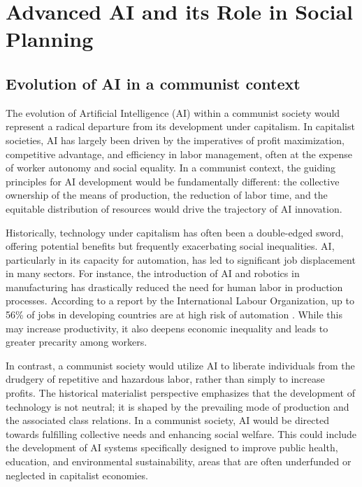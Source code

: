 \section{Advanced AI and its Role in Social Planning}

\subsection{Evolution of AI in a communist context}

The evolution of Artificial Intelligence (AI) within a communist society would represent a radical departure from its development under capitalism. In capitalist societies, AI has largely been driven by the imperatives of profit maximization, competitive advantage, and efficiency in labor management, often at the expense of worker autonomy and social equality. In a communist context, the guiding principles for AI development would be fundamentally different: the collective ownership of the means of production, the reduction of labor time, and the equitable distribution of resources would drive the trajectory of AI innovation.

Historically, technology under capitalism has often been a double-edged sword, offering potential benefits but frequently exacerbating social inequalities. AI, particularly in its capacity for automation, has led to significant job displacement in many sectors. For instance, the introduction of AI and robotics in manufacturing has drastically reduced the need for human labor in production processes. According to a report by the International Labour Organization, up to 56\% of jobs in developing countries are at high risk of automation \cite[pp.~16-18]{ILO2016AutomationRisk}. While this may increase productivity, it also deepens economic inequality and leads to greater precarity among workers.

In contrast, a communist society would utilize AI to liberate individuals from the drudgery of repetitive and hazardous labor, rather than simply to increase profits. The historical materialist perspective emphasizes that the development of technology is not neutral; it is shaped by the prevailing mode of production and the associated class relations. In a communist society, AI would be directed towards fulfilling collective needs and enhancing social welfare. This could include the development of AI systems specifically designed to improve public health, education, and environmental sustainability, areas that are often underfunded or neglected in capitalist economies.

